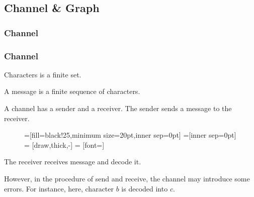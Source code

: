 \subsection{\texorpdfstring{Channel \& Graph}{Channel and Graph}}

\subsubsection*{Channel}

      \begin{frame}
            \frametitle{Channel}
            \begin{definition}[channel]
                  Characters is a finite set.

                  A message is a finite sequence of characters.

                  A channel has a sender and a receiver.
                  The sender sends a message to the receiver.
                  \begin{figure}[h!]
                        =[fill=black!25,minimum size=20pt,inner sep=0pt]
                        =[inner sep=0pt]
                         = [draw,thick,-]
                         = [font=\small]
                  \end{figure}
                  \pause
                  
                  The receiver receives message and decode it.
                  \pause

                  However, in the procedure of send and receive, the channel may introduce some errors. For instance, here, character $b$ is decoded into $c$. 
            \end{definition}
      \end{frame}

